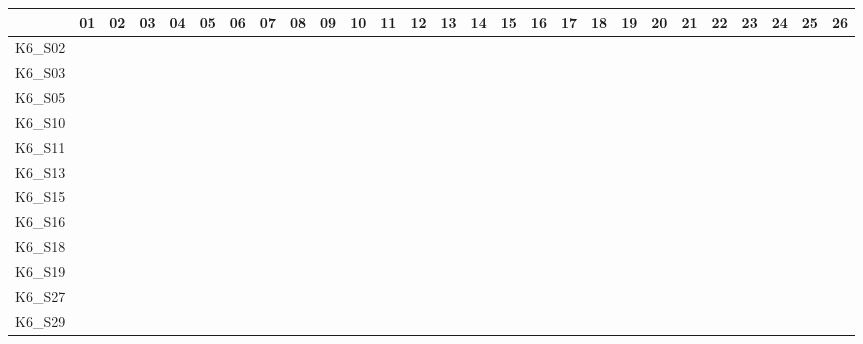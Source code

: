 \begin{table}[htpb]
    \setlength{\tabcolsep}{0.2em}
    \tiny
    \centering
    \begin{tabular}{l|rrrrrrrrrrrrrrrrrrrrrrrrrr}
        \toprule
                & 01 & 02 & 03 & 04 & 05 & 06 & 07 & 08 & 09 & 10 & 11 & 12 & 13 & 14 & 15 & 16 & 17 & 18 & 19 & 20 & 21 & 22 & 23 & 24 & 25 & 26 \\
        \midrule
        K6\_S02 & \n & \n & \n & \n & \n & \n & \n & \n & \n & \n & \n & \n & \e & \n & \n & \n & \n & \n & \n & \n & \n & \e & \e & \n & \n & \n \\
        K6\_S03 & \n & \n & \n & \n & \n & \n & \n & \n & \n & \n & \n & \n & \e & \n & \n & \n & \n & \n & \n & \n & \n & \n & \e & \n & \n & \n \\
        K6\_S05 & \n & \n & \n & \n & \n & \n & \n & \n & \n & \n & \n & \n & \n & \n & \n & \n & \n & \n & \n & \e & \e & \n & \e & \n & \n & \n \\
        K6\_S10 & \n & \n & \n & \n & \n & \n & \n & \n & \n & \n & \n & \n & \n & \n & \n & \n & \n & \n & \n & \n & \n & \n & \n & \n & \n & \e \\
        K6\_S11 & \n & \n & \n & \n & \n & \n & \n & \e & \n & \n & \n & \n & \n & \n & \n & \n & \n & \n & \n & \n & \n & \n & \n & \n & \n & \n \\
        K6\_S13 & \n & \n & \n & \n & \n & \n & \n & \n & \n & \n & \n & \n & \n & \n & \n & \n & \n & \n & \n & \n & \n & \n & \n & \n & \n & \n \\
        K6\_S15 & \n & \n & \n & \n & \n & \n & \n & \n & \n & \n & \n & \n & \n & \n & \n & \n & \n & \n & \n & \n & \n & \n & \n & \n & \n & \n \\
        K6\_S16 & \n & \n & \n & \n & \n & \n & \n & \n & \n & \n & \n & \n & \n & \n & \n & \n & \n & \n & \n & \n & \n & \n & \n & \n & \n & \n \\
        K6\_S18 & \n & \n & \n & \n & \n & \n & \n & \n & \n & \n & \n & \n & \n & \n & \n & \n & \n & \n & \n & \n & \n & \n & \n & \n & \n & \n \\
        K6\_S19 & \n & \n & \n & \n & \n & \n & \n & \n & \n & \n & \n & \n & \n & \n & \n & \n & \n & \n & \n & \n & \n & \n & \n & \n & \n & \n \\
        K6\_S27 & \n & \n & \n & \n & \n & \n & \n & \n & \n & \n & \n & \n & \n & \n & \n & \n & \n & \n & \n & \n & \n & \n & \n & \n & \n & \n \\
        K6\_S29 & \n & \n & \n & \n & \n & \n & \n & \n & \n & \n & \n & \n & \n & \n & \n & \n & \n & \n & \n & \n & \n & \n & \n & \n & \n & \n \\

\end{tabular}
\end{table}
